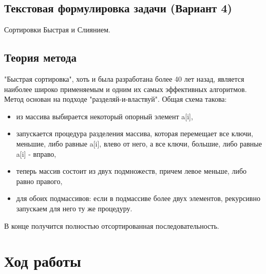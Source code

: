 \documentclass[12pt,a4paper]{scrartcl}
\begin{document}
\subsection{Текстовая формулировка задачи (Вариант 4)}
Сортировки Быстрая и Слиянием.

\subsection{Теория метода}

"Быстрая сортировка", хоть и была разработана более 40 лет назад, является наиболее широко применяемым и одним их самых эффективных алгоритмов. Метод основан на подходе "разделяй-и-властвуй". Общая схема такова:

\begin{itemize}
  \item из массива выбирается некоторый опорный элемент a[i],
  \item запускается процедура разделения массива, которая перемещает все ключи, меньшие, либо равные a[i], влево от него, а все ключи, большие, либо равные a[i] - вправо,
  \item теперь массив состоит из двух подмножеств, причем левое меньше, либо равно правого,
  \item для обоих подмассивов: если в подмассиве более двух элементов, рекурсивно запускаем для него ту же процедуру.
\end{itemize}

В конце получится полностью отсортированная последовательность.


\section{Ход работы}
\end{document}

